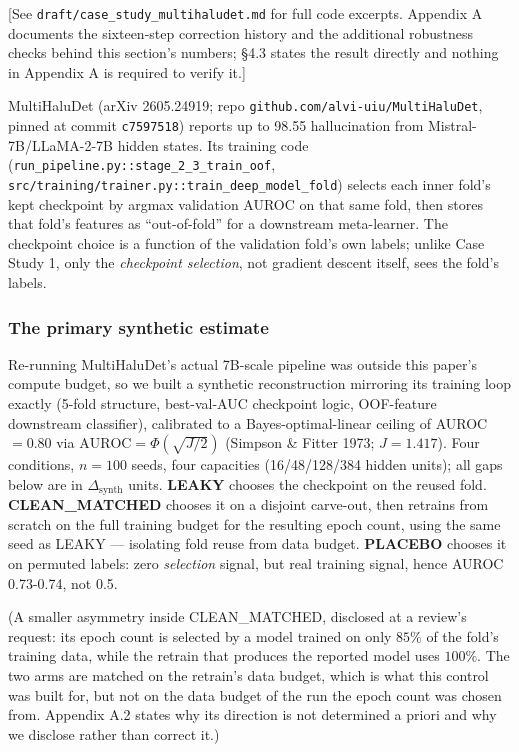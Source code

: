 \documentclass[10pt]{article} %
\begin{document}
[See \texttt{draft/case\_study\_multihaludet.md} for full code excerpts. Appendix A
documents the sixteen-step correction history and the additional
robustness checks behind this section's numbers; §4.3 states the result
directly and nothing in Appendix A is required to verify it.]

MultiHaluDet (arXiv 2605.24919; repo \texttt{github.com/alvi-uiu/MultiHaluDet},
pinned at commit \texttt{c7597518}) reports up to 98.55%
hallucination from Mistral-7B/LLaMA-2-7B hidden states. Its training code
(\texttt{run\_pipeline.py::stage\_2\_3\_train\_oof},
\texttt{src/training/trainer.py::train\_deep\_model\_fold}) selects each inner
fold's kept checkpoint by argmax validation AUROC on that same fold, then
stores that fold's features as ``out-of-fold'' for a downstream
meta-learner. The checkpoint choice is a function of the validation
fold's own labels; unlike Case Study 1, only the \emph{checkpoint selection},
not gradient descent itself, sees the fold's labels.

\subsubsection{The primary synthetic estimate}

Re-running MultiHaluDet's actual 7B-scale pipeline was outside this paper's
compute budget, so we built a synthetic reconstruction mirroring its training
loop exactly (5-fold structure, best-val-AUC checkpoint logic, OOF-feature
downstream classifier), calibrated to a Bayes-optimal-linear ceiling of
AUROC$=0.80$ via $\text{AUROC}=\Phi(\sqrt{J/2})$ (Simpson \& Fitter 1973;
$J=1.417$). Four conditions, $n=100$ seeds, four capacities (16/48/128/384
hidden units); all gaps below are in $\Delta_{\text{synth}}$ units.
\textbf{LEAKY} chooses the checkpoint on the reused fold. \textbf{CLEAN\_MATCHED}
chooses it on a disjoint carve-out, then retrains from scratch on the full
training budget for the resulting epoch count, using the same seed as LEAKY
--- isolating fold reuse from data budget. \textbf{PLACEBO} chooses it on
permuted labels: zero \emph{selection} signal, but real training signal,
hence AUROC 0.73-0.74, not 0.5.

(A smaller asymmetry inside CLEAN\_MATCHED, disclosed at a review's request:
its epoch count is selected by a model trained on only $85\%$ of the fold's
training data, while the retrain that produces the reported model uses $100\%$.
The two arms are matched on the retrain's data budget, which is what this
control was built for, but not on the data budget of the run the epoch count
was chosen from. Appendix A.2 states why its direction is not determined a
priori and why we disclose rather than correct it.)
\end{document}
